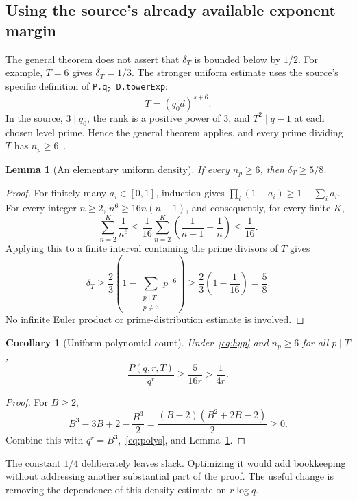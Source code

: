 \documentclass[11pt,a4paper]{article}
\newtheorem{lemma}[theorem]{Lemma}
\newtheorem{corollary}[theorem]{Corollary}
\theoremstyle{definition}
\theoremstyle{remark}
\begin{document}
\subsection{Using the source's already available exponent margin}

The general theorem does not assert that $\delta_T$ is bounded below by
$1/2$. For example, $T=6$ gives $\delta_T=1/3$. The stronger uniform
estimate uses the source's specific definition of \texttt{P.q\textsubscript{2}\ D.towerExp}:
\begin{equation}
 T=(q_0d)^{s+6}.
 \label{eq:sourceT}
\end{equation}
In the source, $3\mid q_0$, the rank is a positive power of $3$, and
$T^2\mid q-1$ at each chosen level prime. Hence the general theorem
applies, and every prime dividing $T$ has $n_p\ge6$~\cite{parameters}.

\begin{lemma}[An elementary uniform density]
\label{lem:density}
If every $n_p\ge6$, then $\delta_T\ge5/8$.
\end{lemma}
\begin{proof}
For finitely many $a_i\in[0,1]$, induction gives
$\prod_i(1-a_i)\ge1-\sum_i a_i$. For every integer $n\ge2$,
$n^6\ge16n(n-1)$, and consequently, for every finite $K$,
\[
 \sum_{n=2}^{K}\frac1{n^6}
 \le\frac1{16}\sum_{n=2}^{K}\left(\frac1{n-1}-\frac1n\right)
 \le\frac1{16}.
\]
Applying this to a finite interval containing the prime divisors of $T$
gives
\[
 \delta_T\ge\frac23\left(1-\sum_{\substack{p\mid T\\p\ne3}}p^{-6}\right)
 \ge\frac23\left(1-\frac1{16}\right)=\frac58.
\]
No infinite Euler product or prime-distribution estimate is involved.
\end{proof}

\begin{corollary}[Uniform polynomial count]
\label{cor:count}
Under~\eqref{eq:hyp} and $n_p\ge6$ for all $p\mid T$,
\begin{equation}
 \frac{P(q,r,T)}{q^r}\ge\frac5{16r}>\frac1{4r}.
 \label{eq:uniform}
\end{equation}
\end{corollary}
\begin{proof}
For $B\ge2$,
\[
 B^3-3B+2-\frac{B^3}{2}
 =\frac{(B-2)(B^2+2B-2)}2\ge0.
\]
Combine this with $q^r=B^3$,~\eqref{eq:polys}, and
Lemma~\ref{lem:density}.
\end{proof}

The constant $1/4$ deliberately leaves slack. Optimizing it would add
bookkeeping without addressing another substantial part of the proof.
The useful change is removing the dependence of this density estimate
on $r\log q$.
\end{document}
